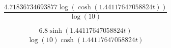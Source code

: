\documentclass{article}
\begin{document}
\newcommand{\n}{4.71836734693877}
\newcommand{\c}{1.44117647058824}

$$
\frac{\n{} \log{\left(\cosh{\left(1.44117647058824 t \right)} \right)}}{\log{\left(10 \right)}}
$$

$$
\frac{6.8 \sinh{\left(\c{} t \right)}}{\log{\left(10 \right)} \cosh{\left(\c{} t \right)}}
$$
\end{document}
